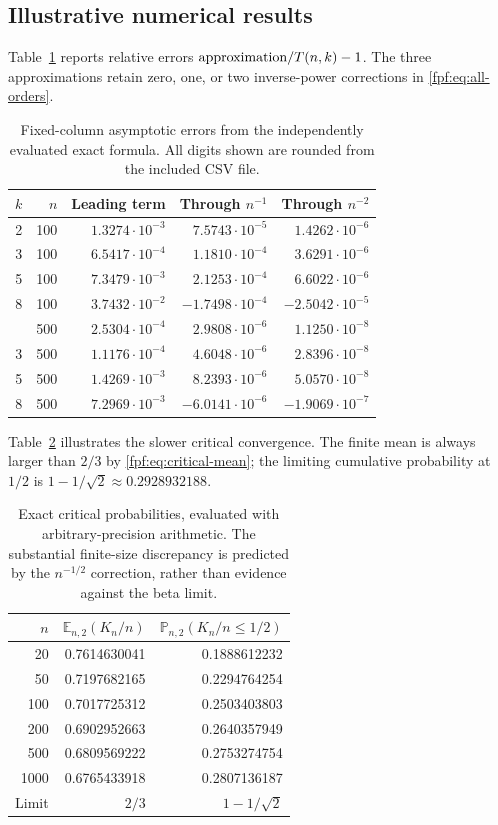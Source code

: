 \documentclass[11pt]{article}
\numberwithin{equation}{section}
\theoremstyle{definition}
\newcommand{\E}{\mathbb E}
\newcommand{\Prob}{\mathbb P}
\begin{document}
\subsection{Illustrative numerical results}
Table~\ref{fpf:tab:fixed} reports relative errors
$\hbox{approximation}/T(n,k)-1$. The three approximations retain zero, one,
or two inverse-power corrections in \eqref{fpf:eq:all-orders}.
\begin{table}[htbp]
\centering
\small
\begin{tabular}{rrrrr}
\toprule
$k$ & $n$ & Leading term & Through $n^{-1}$ & Through $n^{-2}$\\
\midrule
2 & 100 & $1.3274\cdot10^{-3}$ & $7.5743\cdot10^{-5}$ & $1.4262\cdot10^{-6}$\\
3 & 100 & $6.5417\cdot10^{-4}$ & $1.1810\cdot10^{-4}$ & $3.6291\cdot10^{-6}$\\
5 & 100 & $7.3479\cdot10^{-3}$ & $2.1253\cdot10^{-4}$ & $6.6022\cdot10^{-6}$\\
8 & 100 & $3.7432\cdot10^{-2}$ & $-1.7498\cdot10^{-4}$ & $-2.5042\cdot10^{-5}$\\
\addlinespace
2 & 500 & $2.5304\cdot10^{-4}$ & $2.9808\cdot10^{-6}$ & $1.1250\cdot10^{-8}$\\
3 & 500 & $1.1176\cdot10^{-4}$ & $4.6048\cdot10^{-6}$ & $2.8396\cdot10^{-8}$\\
5 & 500 & $1.4269\cdot10^{-3}$ & $8.2393\cdot10^{-6}$ & $5.0570\cdot10^{-8}$\\
8 & 500 & $7.2969\cdot10^{-3}$ & $-6.0141\cdot10^{-6}$ & $-1.9069\cdot10^{-7}$\\
\bottomrule
\end{tabular}
\caption{Fixed-column asymptotic errors from the independently evaluated
exact formula. All digits shown are rounded from the included CSV file.}
\label{fpf:tab:fixed}
\end{table}

Table~\ref{fpf:tab:critical} illustrates the slower critical convergence. The
finite mean is always larger than $2/3$ by
\eqref{fpf:eq:critical-mean}; the limiting cumulative probability at $1/2$ is
$1-1/\sqrt2\approx0.2928932188$.
\begin{table}[htbp]
\centering
\begin{tabular}{rrr}
\toprule
$n$ & $\E_{n,2}(K_n/n)$ & $\Prob_{n,2}(K_n/n\le1/2)$\\
\midrule
20 & 0.7614630041 & 0.1888612232\\
50 & 0.7197682165 & 0.2294764254\\
100 & 0.7017725312 & 0.2503403803\\
200 & 0.6902952663 & 0.2640357949\\
500 & 0.6809569222 & 0.2753274754\\
1000 & 0.6765433918 & 0.2807136187\\
\addlinespace
Limit & $2/3$ & $1-1/\sqrt2$\\
\bottomrule
\end{tabular}
\caption{Exact critical probabilities, evaluated with arbitrary-precision
arithmetic. The substantial finite-size discrepancy is predicted by the
$n^{-1/2}$ correction, rather than evidence against the beta limit.}
\label{fpf:tab:critical}
\end{table}
\end{document}
